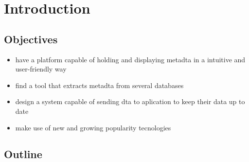 \chapter{Introduction}
\label{chapter:introduction}


\section{Objectives}

\begin{itemize}
    \item have a platform capable of holding and displaying metadta in a intuitive and user-friendly way
    \item find a tool that extracts metadta from several databases
    \item design a system capable of sending dta to aplication to keep their data up to date
    \item make use of new and growing popularity tecnologies
\end{itemize}

\section{Outline}
